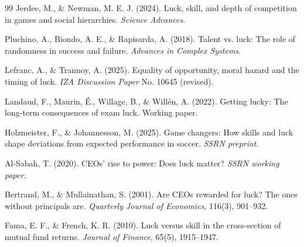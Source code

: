 \begin{thebibliography}{99}
     Jerdee, M., \& Newman, M. E. J. (2024). Luck,
      skill, and depth of competition in games and social hierarchies.
      \textit{Science Advances}.

     Pluchino, A., Biondo, A. E., \& Rapisarda, A.
      (2018). Talent vs. luck: The role of randomness in success and failure.
      \textit{Advances in Complex Systems}.

     Lefranc, A., \& Trannoy, A. (2025). Equality
      of opportunity, moral hazard and the timing of luck. \textit{IZA
      Discussion Paper} No. 10645 (revised).

     Landaud, F., Maurin, \'E., Willage, B., \&
      Will\'en, A. (2022). Getting lucky: The long-term consequences of
      exam luck. Working paper.

     Holzmeister, F., \& Johannesson, M. (2025).
      Game changers: How skills and luck shape deviations from expected
      performance in soccer. \textit{SSRN preprint}.

     Al-Sabah, T. (2020). CEOs' rise to power: Does
      luck matter? \textit{SSRN working paper}.

     Bertrand, M., \& Mullainathan, S. (2001). Are
      CEOs rewarded for luck? The ones without principals are. \textit{Quarterly
      Journal of Economics}, 116(3), 901--932.

     Fama, E. F., \& French, K. R. (2010). Luck versus
      skill in the cross-section of mutual fund returns. \textit{Journal
      of Finance}, 65(5), 1915--1947.
  \end{thebibliography}


